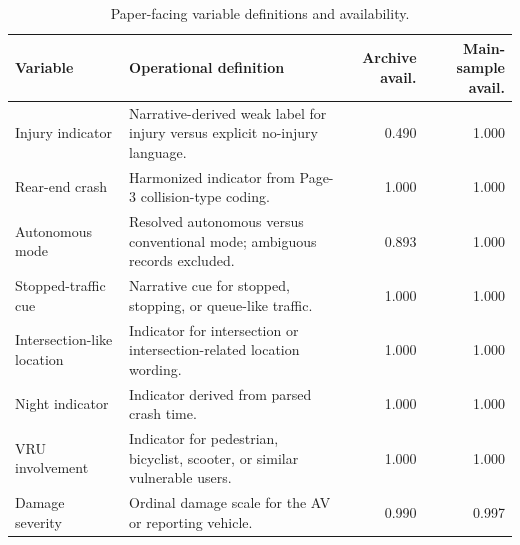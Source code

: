 \begin{table}[H]
\centering
\caption{Paper-facing variable definitions and availability.}
\label{tab:key_variables}
\scriptsize
\renewcommand{\arraystretch}{1.08}
\begin{tabular}{p{2.35cm}p{5.2cm}rr}
\toprule
Variable & Operational definition & Archive avail. & Main-sample avail. \\
\midrule
Injury indicator & Narrative-derived weak label for injury versus explicit no-injury language. & 0.490 & 1.000 \\
Rear-end crash & Harmonized indicator from Page-3 collision-type coding. & 1.000 & 1.000 \\
Autonomous mode & Resolved autonomous versus conventional mode; ambiguous records excluded. & 0.893 & 1.000 \\
Stopped-traffic cue & Narrative cue for stopped, stopping, or queue-like traffic. & 1.000 & 1.000 \\
Intersection-like location & Indicator for intersection or intersection-related location wording. & 1.000 & 1.000 \\
Night indicator & Indicator derived from parsed crash time. & 1.000 & 1.000 \\
VRU involvement & Indicator for pedestrian, bicyclist, scooter, or similar vulnerable users. & 1.000 & 1.000 \\
Damage severity & Ordinal damage scale for the AV or reporting vehicle. & 0.990 & 0.997 \\
\bottomrule
\end{tabular}
\end{table}
